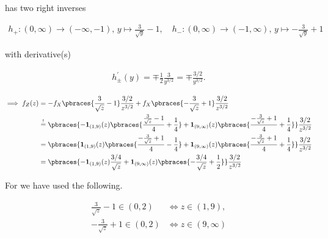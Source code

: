 \begin{solution}
\begin{enumerate}[label = (\alph*)]
    has two right inverses

    \begin{align*}
        h_+:
            (0, \infty) \to (-\infty, -1), \,
            y \mapsto \frac{3}{\sqrt y} - 1,
        \quad
        h_-:
            (0, \infty) \to (-1, \infty), \,
            y \mapsto -\frac{3}{\sqrt y} + 1
    \end{align*}

    with derivative(s)

    \begin{align*}
        h_\pm^\prime(y)
        =
        \mp \frac{1}{2} \frac{3}{y^{3 / 2}}
        =
        \mp \frac{3 / 2}{y^{3 / 2}}.
    \end{align*}

    \begin{align*}
        \implies
        f_Z(z)
        & =
        -
        f_X \pbraces{ \frac{3}{\sqrt z} - 1} \frac{3 / 2}{z^{3 / 2}}
        +
        f_X \pbraces{-\frac{3}{\sqrt z} + 1} \frac{3 / 2}{z^{3 / 2}} \\
        & \stackrel{!}{=}
        \pbraces
        {
            -
            \mathbf 1_{(1, 9)}(z)
            \pbraces
            {
                \frac{\frac{3}{\sqrt z} - 1}{4}
                +
                \frac{1}{4}
            }
            +
            \mathbf 1_{(9, \infty)}(z)
            \pbraces
            {
                \frac{-\frac{3}{\sqrt z} + 1}{4}
                +
                \frac{1}{4}
            }
        }
        \frac{3 / 2}{z^{3 / 2}} \\
        & =
        \pbraces
        {
            \mathbf 1_{(1, 9)}(z)
            \pbraces
            {
                \frac{-\frac{3}{\sqrt z} + 1}{4}
                -
                \frac{1}{4}
            }
            +
            \mathbf 1_{(9, \infty)}(z)
            \pbraces
            {
                \frac{-\frac{3}{\sqrt z} + 1}{4}
                +
                \frac{1}{4}
            }
        }
        \frac{3 / 2}{z^{3 / 2}} \\
        & =
        \pbraces
        {
            -
            \mathbf 1_{(1, 9)}(z)
            \frac{3 / 4}{\sqrt z}
            +
            \mathbf 1_{(9, \infty)}(z)
            \pbraces
            {
                -\frac{3 / 4}{\sqrt z}
                +
                \frac{1}{2}
            }
        }
        \frac{3 / 2}{z^{3 / 2}}
    \end{align*}

    For \Quote{$!$} we have used the following.

    \begin{align*}
        \frac{3}{\sqrt z} - 1 \in (0, 2)
        & \iff
        z \in (1, 9), \\
        -\frac{3}{\sqrt z} + 1 \in (0, 2)
        & \iff
        z \in (9, \infty)
    \end{align*}

\end{enumerate}

\end{solution}

